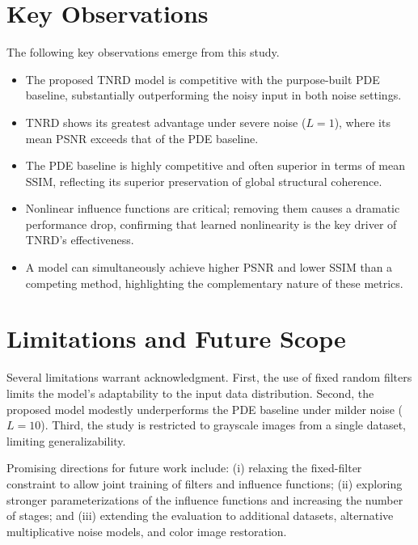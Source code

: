 \documentclass[conference]{IEEEtran}
\begin{document}
\section{Key Observations}
The following key observations emerge from this study.
\begin{itemize}
  \item The proposed TNRD model is competitive with the purpose-built PDE baseline,
        substantially outperforming the noisy input in both noise settings.
  \item TNRD shows its greatest advantage under severe noise ($L=1$), where its mean
        PSNR exceeds that of the PDE baseline.
  \item The PDE baseline is highly competitive and often superior in terms of mean
        SSIM, reflecting its superior preservation of global structural coherence.
  \item Nonlinear influence functions are critical; removing them causes a
        dramatic performance drop, confirming that learned nonlinearity is the key
        driver of TNRD's effectiveness.
  \item A model can simultaneously achieve higher PSNR and lower SSIM than a
        competing method, highlighting the complementary nature of these metrics.
\end{itemize}

\section{Limitations and Future Scope}
Several limitations warrant acknowledgment. First, the use of fixed random filters
limits the model's adaptability to the input data distribution. Second, the
proposed model modestly underperforms the PDE baseline under milder noise
($L=10$). Third, the study is restricted to grayscale images from a single dataset,
limiting generalizability.

Promising directions for future work include: (i) relaxing the fixed-filter
constraint to allow joint training of filters and influence functions; (ii)
exploring stronger parameterizations of the influence functions and increasing the
number of stages; and (iii) extending the evaluation to additional datasets,
alternative multiplicative noise models, and color image restoration.
\end{document}
